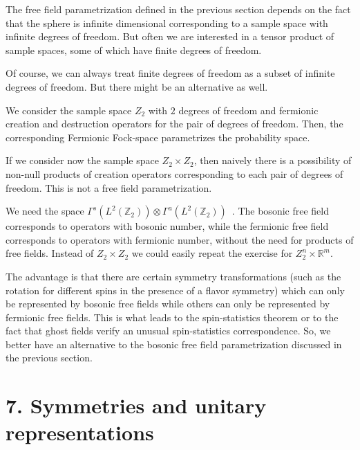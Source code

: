 \documentclass[11pt]{book}
\begin{document}
The free field parametrization defined in the previous section depends
on the fact that the sphere is infinite dimensional corresponding to a
sample space with infinite degrees of freedom. But often we are
interested in a tensor product of sample spaces, some of which have
finite degrees of freedom.

Of course, we can always treat finite degrees of freedom as a subset of
infinite degrees of freedom. But there might be an alternative as well.

We consider the sample space \(Z_2\) with \(2\) degrees of freedom and
fermionic creation and destruction operators for the pair of degrees of
freedom. Then, the corresponding Fermionic Fock-space parametrizes the
probability space.

If we consider now the sample space \(Z_2\times Z_2\), then naively
there is a possibility of non-null products of creation operators
corresponding to each pair of degrees of freedom. This is not a free
field parametrization.

We need the space
\(\Gamma^s(L^2(\mathbb{Z}_2))\otimes \Gamma^a(L^2(\mathbb{Z}_2)) \)~\cite{Petz:1990gb}\cite{Fock}. The bosonic free
field corresponds to operators with bosonic number, while the fermionic
free field corresponds to operators with fermionic number, without the
need for products of free fields. Instead of \(Z_2\times Z_2\) we could
easily repeat the exercise for \(Z_2^n\times \mathbb{R}^m\).

The advantage is that there are certain symmetry transformations (such
as the rotation for different spins in the presence of a flavor
symmetry\cite{duck1998toward}) which can only be represented by bosonic free fields while
others can only be represented by fermionic free fields. This is what
leads to the spin-statistics
theorem\cite{duck1998toward}
or to the fact that ghost fields verify an unusual spin-statistics
correspondence. So, we better have an alternative to the bosonic free
field parametrization discussed in the previous section.

\hypertarget{symmetries-and-unitary-representations}{%
\section{7. Symmetries and unitary
representations}\label{symmetries-and-unitary-representations}}
\end{document}
